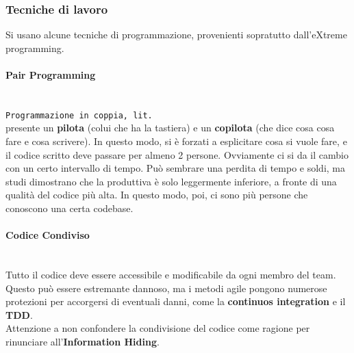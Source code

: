 \documentclass[a4paper,12pt]{article}
\begin{document}
\subsubsection{Tecniche di lavoro}
Si usano alcune tecniche di programmazione, provenienti sopratutto dall'eXtreme programming.
\paragraph{Pair Programming}\mbox{}\\
\texttt{Programmazione in coppia, lit.}\\
	\E presente un \textbf{pilota} (colui che ha la tastiera) e un \textbf{copilota} (che dice cosa cosa fare e cosa scrivere). In questo modo, si è forzati a esplicitare cosa si vuole fare, e il codice scritto deve passare per almeno 2 persone. Ovviamente ci si da il cambio con un certo intervallo di tempo. Può sembrare una perdita di tempo e soldi, ma studi dimostrano che la produttiva è solo leggermente inferiore, a fronte di una qualità del codice più alta. In questo modo, poi, ci sono più persone che conoscono una certa codebase.
	
\paragraph{Codice Condiviso}\mbox{}\\
Tutto il codice deve essere accessibile e modificabile da ogni membro del team. Questo può essere estremante dannoso, ma i metodi agile pongono numerose protezioni per accorgersi di eventuali danni, come la \textbf{continuos integration} e il \textbf{TDD}.\\
Attenzione a non confondere la condivisione del codice come ragione per rinunciare all'\textbf{Information Hiding}.
\end{document}
